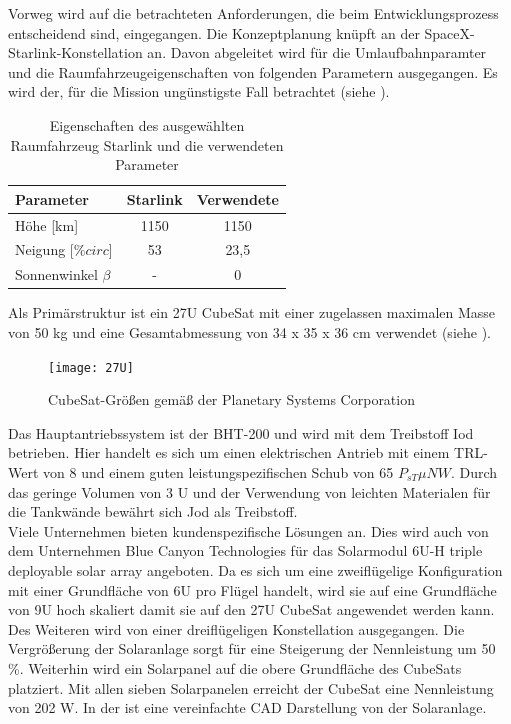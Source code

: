 Vorweg wird auf die betrachteten Anforderungen, die beim Entwicklungsprozess entscheidend  sind, eingegangen. Die Konzeptplanung knüpft an der SpaceX-Starlink-Konstellation an. Davon abgeleitet wird für die Umlaufbahnparamter und die Raumfahrzeugeigenschaften von folgenden Parametern ausgegangen. Es wird der, für die Mission ungünstigste Fall betrachtet (siehe ).
\begin{table}[!h]
\centering
	\begin{tabular}{|l|c|c|}
\hline
\multicolumn{1}{|l|}{Parameter}          & \multicolumn{1}{l|}{Starlink} & \multicolumn{1}{l|}{Verwendete} \\ \hline
\multicolumn{1}{|l|}{Höhe {[}km{]}}      & \multicolumn{1}{c|}{1150}     & \multicolumn{1}{c|}{1150}       \\ \hline
\multicolumn{1}{|l|}{Neigung {[}$\%circ${]}} & \multicolumn{1}{c|}{53}       & \multicolumn{1}{c|}{23,5}       \\ \hline
\multicolumn{1}{|l|}{Sonnenwinkel $\beta$}       & \multicolumn{1}{c|}{-}        & \multicolumn{1}{c|}{0}          \\ \hline          
	\end{tabular}
	\caption{Eigenschaften des ausgewählten Raumfahrzeug Starlink und die verwendeten Parameter}
	\label{tab:parameter}
\end{table}
Als Primärstruktur ist ein 27U CubeSat mit einer zugelassen maximalen Masse von 50 kg und eine Gesamtabmessung von 34 x 35 x 36 cm verwendet (siehe ). 				
				\begin{figure}[!h]
					\centering
						\texttt{[image: 27U]}
					\caption{CubeSat-Größen gemäß der Planetary Systems Corporation \cite{Lettau.}}
					\label{fig:27U}
				\end{figure}
Das Hauptantriebssystem ist der BHT-200 und wird mit dem Treibstoff Iod betrieben. Hier handelt es sich um einen elektrischen Antrieb mit einem TRL-Wert von 8 und einem guten leistungspezifischen Schub von 65 $P_{sT} {\mu N}{W}$. Durch das geringe Volumen von 3 U und der Verwendung von leichten Materialen für die Tankwände bewährt sich Jod als Treibstoff. \\
Viele Unternehmen bieten kundenspezifische Lösungen an. Dies wird auch von dem Unternehmen Blue Canyon Technologies für das Solarmodul 6U-H triple deployable solar array angeboten. Da es sich um eine zweiflügelige Konfiguration mit einer Grundfläche von 6U pro Flügel handelt, wird sie auf eine Grundfläche von 9U hoch skaliert damit sie auf  den 27U CubeSat angewendet werden kann. Des Weiteren wird von einer dreiflügeligen Konstellation ausgegangen. Die Vergrößerung der Solaranlage sorgt für eine Steigerung der Nennleistung um 50 \%. Weiterhin wird ein Solarpanel auf die obere Grundfläche des CubeSats platziert. Mit allen sieben Solarpanelen erreicht der CubeSat eine Nennleistung von 202 W. In der  ist eine vereinfachte CAD Darstellung von der Solaranlage. 

